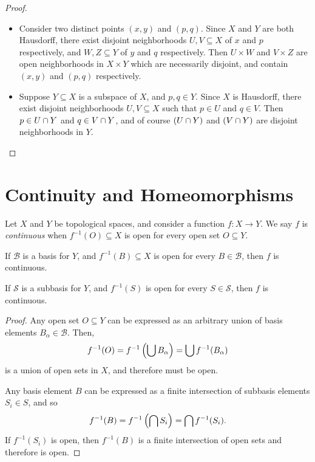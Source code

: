 \begin{proof}
    \proofbreak
    \begin{itemize}
        \item Consider two distinct points $(x, y)$ and $(p, q)$. Since $X$ and $Y$ are both Hausdorff, there exist disjoint neighborhoods $U, V \subseteq X$ of $x$ and $p$ respectively, and $W, Z \subseteq Y$ of $y$ and $q$ respectively. Then $U \times W$ and $V \times Z$ are open neighborhoods in $X \times Y$ which are necessarily disjoint, and contain $(x, y)$ and $(p, q)$ respectively.
        \item Suppose $Y \subseteq X$ is a subspace of $X$, and $p, q \in Y$. Since $X$ is Hausdorff, there exist disjoint neighborhoods $U, V \subseteq X$ such that $p \in U$ and $q \in V$. Then $p \in U \cap Y$ and $q \in V \cap Y$, and of course $(U \cap Y)$ and $(V \cap Y)$ are disjoint neighborhoods in $Y$.
    \end{itemize}
\end{proof}

\section{Continuity and Homeomorphisms}

\begin{defn}
    Let $X$ and $Y$ be topological spaces, and consider a function $f: X \to Y$. We say $f$ is \emph{continuous} when $f^{-1}(O) \subseteq X$ is open for every open set $O \subseteq Y$.
\end{defn}

\begin{lemma}
    If $\mathcal{B}$ is a basis for $Y$, and $f^{-1}(B) \subseteq X$ is open for every $B \in \mathcal{B}$, then $f$ is continuous.

    If $\mathcal{S}$ is a subbasis for $Y$, and $f^{-1}(S)$ is open for every $S \in \mathcal{S}$, then $f$ is continuous.
\end{lemma}

\begin{proof}
    Any open set $O \subseteq Y$ can be expressed as an arbitrary union of basis elements $B_{\alpha} \in \mathcal{B}$. Then,
    \begin{align*}
        f^{-1}(O) = f^{-1}\left(\bigcup B_{\alpha}\right) = \bigcup f^{-1}(B_{\alpha})
    \end{align*}
    is a union of open sets in $X$, and therefore must be open.

    Any basis element $B$ can be expressed as a finite intersection of subbasis elements $S_{i} \in S$, and so
    \begin{align*}
        f^{-1}(B) = f^{-1}\left(\bigcap S_{i}\right) = \bigcap f^{-1}(S_i).
    \end{align*}
    If $f^{-1}(S_i)$ is open, then $f^{-1}(B)$ is a finite intersection of open sets and therefore is open.
\end{proof}

